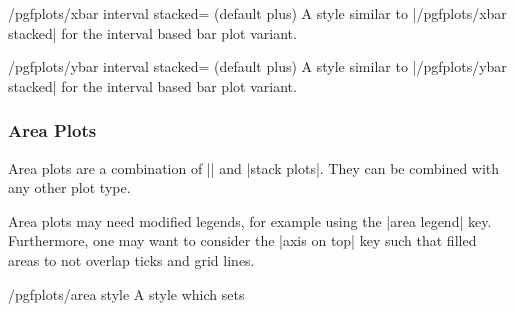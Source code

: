 \begin{stylekey}{/pgfplots/xbar interval stacked= (default plus)}
	A style similar to |/pgfplots/xbar stacked| for the interval based bar plot variant.
\end{stylekey}
\begin{stylekey}{/pgfplots/ybar interval stacked= (default plus)}
	A style similar to |/pgfplots/ybar stacked| for the interval based bar plot variant.
\end{stylekey}

\subsubsection{Area Plots}
Area plots are a combination of |\closedcycle| and |stack plots|. They can be combined with any other plot type.

\begin{codeexample}[]
\end{codeexample}
\noindent
Area plots may need modified legends, for example using the |area legend| key. Furthermore, one may want to consider the |axis on top| key such that filled areas to not overlap ticks and grid lines. 

\begin{stylekey}{/pgfplots/area style}
	A style which sets
\begin{codeexample}
\end{codeexample}
\end{stylekey}

\begin{codeexample}[]
\end{codeexample}

